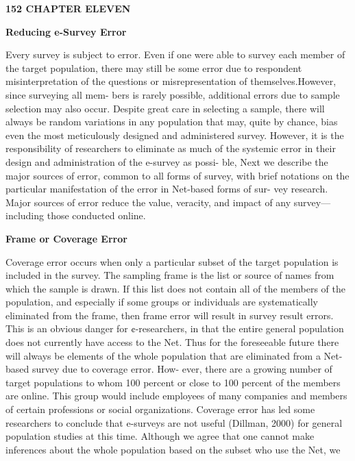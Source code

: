 \documentclass [10pt,a4paper]{book}
\begin{document}
\begin{flushleft}
\textbf{152   CHAPTER ELEVEN}
\end{flushleft}
\begin{flushleft}
\textbf{Reducing e-Survey Error}
\end{flushleft}
Every survey is subject to error. Even if one were able to survey each member of the
target population, there may still be some error due to respondent misinterpretation of
the questions or misrepresentation of themselves.However, since surveying all mem-
bers is rarely possible, additional errors due to sample selection may also occur.
Despite great care in selecting a sample, there will always be random variations in any
population that may, quite by chance, bias even the most meticulously designed and
administered survey. However, it is the responsibility of researchers to eliminate as
much of the systemic error in their design and administration of the e-survey as possi-
ble, Next we describe the major sources of error, common to all forms of survey, with
brief notations on the particular manifestation of the error in Net-based forms of sur-
vey research. Major sources of error reduce the value, veracity, and impact of any
survey—including those conducted online.
\begin{flushleft}
\textbf{Frame or Coverage Error}
\end{flushleft}
Coverage error occurs when only a particular subset of the target population is
included in the survey. The sampling frame is the list or source of names from which
the sample is drawn. If this list does not contain all of the members of the population,
and especially if some groups or individuals are systematically eliminated from the
frame, then frame error will result in survey result errors. This is an obvious danger for
¢-researchers, in that the entire general population does not currently have access to
the Net. Thus for the foreseeable future there will always be elements of the whole
population that are eliminated from a Net-based survey due to coverage error. How-
ever, there are a growing number of target populations to whom 100 percent or close
to 100 percent of the members are online. This group would include employees of
many companies and members of certain professions or social organizations. Coverage
error has led some researchers to conclude that e-surveys are not useful (Dillman,
2000) for general population studies at this time. Although we agree that one cannot
make inferences about the whole population based on the subset who use the Net, we
\end{document}
